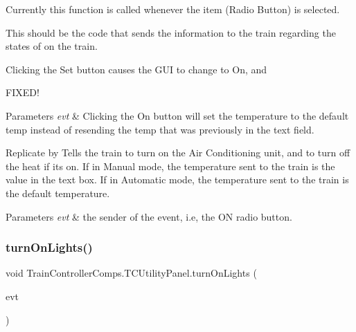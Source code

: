 Currently this function is called whenever the item (Radio Button) is selected. 

This should be the code that sends the information to the train regarding the states of on the train.

Clicking the \textquotesingle{}Set\textquotesingle{} button causes the G\+UI to change to \textquotesingle{}On\textquotesingle{}, and

F\+I\+X\+E\+D!


\begin{DoxyParams}{Parameters}
{\em evt} & Clicking the \textquotesingle{}On\textquotesingle{} button will set the temperature to the default temp instead of resending the temp that was previously in the text field.\\
\hline
\end{DoxyParams}
Replicate by Tells the train to turn on the Air Conditioning unit, and to turn off the heat if it\textquotesingle{}s on. If in Manual mode, the temperature sent to the train is the value in the text box. If in Automatic mode, the temperature sent to the train is the default temperature.


\begin{DoxyParams}{Parameters}
{\em evt} & the sender of the event, i.\+e, the \textquotesingle{}ON\textquotesingle{} radio button. \\
\hline
\end{DoxyParams}
\mbox{\label{classTrainControllerComps_1_1TCUtilityPanel_ab82461760b088e289135115a3e038bc9}} 
\subsubsection{\texorpdfstring{turn\+On\+Lights()}{turnOnLights()}}
{\footnotesize\ttfamily void Train\+Controller\+Comps.\+T\+C\+Utility\+Panel.\+turn\+On\+Lights (\begin{DoxyParamCaption}\item[{java.\+awt.\+event.\+Action\+Event}]{evt }\end{DoxyParamCaption})\hspace{0.3cm}{\ttfamily [private]}}



